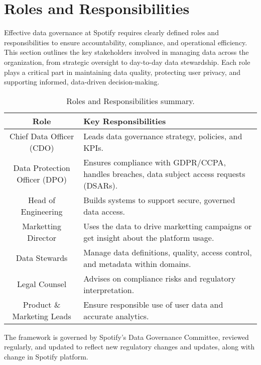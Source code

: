 \documentclass[11pt,a4paper,computermodern]{article}
\begin{document}
\section*{Roles and Responsibilities}

Effective data governance at Spotify requires clearly defined roles and responsibilities to ensure accountability, compliance, and operational efficiency. This section outlines the key stakeholders involved in managing data across the organization, from strategic oversight to day-to-day data stewardship. Each role plays a critical part in maintaining data quality, protecting user privacy, and supporting informed, data-driven decision-making.

\begin{table}[ht]
	\centering
	\begin{threeparttable}
		\caption{Roles and Responsibilities summary.}
		\label{table:roles}
		\begin{tabularx}{0.99\textwidth}{c >{\centering\arraybackslash}X}
			\toprule
			Role & Key Responsibilities  \\
			\midrule
			Chief Data Officer (CDO) & Leads data governance strategy, policies, and KPIs. \\
			Data Protection Officer (DPO) & Ensures compliance with GDPR/CCPA, handles breaches, data subject access requests (DSARs). \\
			Head of Engineering & Builds systems to support secure, governed data access. \\
			Marketting Director & Uses the data to drive marketting campaigns or get insight about the platform usage. \\
			Data Stewards & Manage data definitions, quality, access control, and metadata within domains. \\
			Legal Counsel & Advises on compliance risks and regulatory interpretation. \\
			Product \& Marketing Leads & Ensure responsible use of user data and accurate analytics. \\
			\bottomrule
		\end{tabularx}
	\end{threeparttable}
\end{table}

The framework is governed by Spotify’s Data Governance Committee, reviewed regularly, and updated to reflect new regulatory changes and updates, along with change in Spotify platform.
\end{document}
